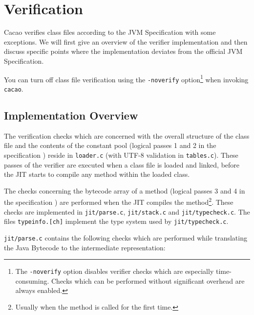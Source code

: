 \section{Verification}

\newcommand{\cmdline}[1]{\texttt{#1}}
\newcommand{\srcfile}[1]{\texttt{#1}}
\newcommand{\code}[1]{\texttt{#1}}
\newcommand{\asgn}{\sqsubseteq}
\newcommand{\qed}{$\Box$}
\newcommand{\norm}[1]{\textrm{norm}\left(#1\right)}
\newcommand{\reft}[2]{\langle #1, #2\rangle}
\newtheorem{definition}{Definition}
\newtheorem{lemma}{Lemma}
\newtheorem{theorem}{Theorem}
\newenvironment{proof}{\noindent\emph{Proof.} }{}

Cacao verifies class files according to the JVM
Specification \cite{javavm99} with some exceptions. We will first give
an overview of the verifier implementation and then discuss specific
points where the implementation deviates from the official JVM
Specification.

You can turn off class file verification using the \cmdline{-noverify}
option\footnote{The \cmdline{-noverify} option disables verifier
checks which are especially time-consuming. Checks which can be
performed without significant overhead are always enabled.} when
invoking
\cmdline{cacao}.

\subsection{Implementation Overview}

The verification checks which are concerned with the overall structure
of the class file and the contents of the constant pool (logical
passes 1 and 2 in the specification \cite{javavm99}) reside in
\srcfile{loader.c} (with UTF-8 validation in
\srcfile{tables.c}). These passes of the verifier are executed when a
class file is loaded and linked, before the JIT starts to compile any
method within the loaded class.

The checks concerning the bytecode array of a method (logical passes 3
and 4 in the specification \cite{javavm99}) are performed when the JIT
compiles the method\footnote{Usually when the method is called for the
first time.}. These checks are implemented in
\srcfile{jit/parse.c}, \srcfile{jit/stack.c} and
\srcfile{jit/typecheck.c}. The files \srcfile{typeinfo.[ch]}
implement the type system used by \srcfile{jit/typecheck.c}.

\srcfile{jit/parse.c} contains the following checks which are performed
while translating the Java Bytecode to the intermediate
representation:

